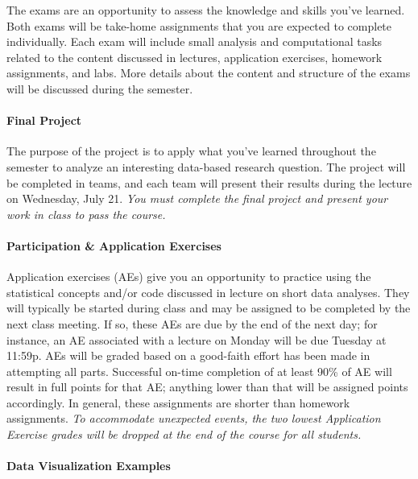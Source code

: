 \documentclass[]{article}
\let\oldparagraph\paragraph
\renewcommand{\paragraph}[1]{\oldparagraph{#1}\mbox{}}
\begin{document}
The exams are an opportunity to assess the knowledge and skills you've
learned. Both exams will be take-home assignments that you are expected
to complete individually. Each exam will include small analysis and
computational tasks related to the content discussed in lectures,
application exercises, homework assignments, and labs. More details
about the content and structure of the exams will be discussed during
the semester.

\hypertarget{final-project}{%
\paragraph{Final Project}\label{final-project}}

The purpose of the project is to apply what you've learned throughout
the semester to analyze an interesting data-based research question. The
project will be completed in teams, and each team will present their
results during the lecture on Wednesday, July 21. \emph{You must
complete the final project and present your work in class to pass the
course.}

\hypertarget{participation-application-exercises}{%
\paragraph{Participation \& Application
Exercises}\label{participation-application-exercises}}

Application exercises (AEs) give you an opportunity to practice using
the statistical concepts and/or code discussed in lecture on short data
analyses. They will typically be started during class and may be
assigned to be completed by the next class meeting. If so, these AEs are
due by the end of the next day; for instance, an AE associated with a
lecture on Monday will be due Tuesday at 11:59p. AEs will be graded
based on a good-faith effort has been made in attempting all parts.
Successful on-time completion of at least 90\% of AE will result in full
points for that AE; anything lower than that will be assigned points
accordingly. In general, these assignments are shorter than homework
assignments. \emph{To accommodate unexpected events, the two lowest
Application Exercise grades will be dropped at the end of the course for
all students.}

\hypertarget{data-visualization-examples}{%
\paragraph{Data Visualization
Examples}\label{data-visualization-examples}}
\end{document}
